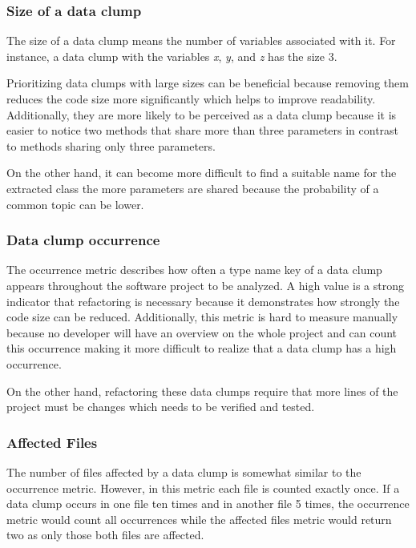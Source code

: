\subsubsection{Size of a data clump}

The size of a data clump means the number of variables associated with it. For instance, a data clump with the variables \textit{x}, \textit{y}, and \textit{z} has the size 3. 

Prioritizing data clumps with large sizes can be beneficial because removing them reduces the code size more significantly which helps to improve readability. Additionally, they are more likely to be perceived as a data clump because it is easier to notice two methods that share more than three parameters in contrast to methods sharing only three parameters. 

On the other hand,  it can become more difficult to find a suitable name for the extracted class the more parameters are shared because the probability of a common topic can be lower. 

\subsubsection{Data clump occurrence}

The occurrence metric describes how often a type name key of a data clump appears throughout the software project to be analyzed. A high value is a strong indicator that refactoring is necessary because it demonstrates how strongly the code size can be reduced. Additionally, this metric is hard to measure manually because no developer will have an overview on the whole project and can count this occurrence making it more difficult to realize that a data clump has a high occurrence.  

On the other hand, refactoring these data clumps require that more lines of the project must be changes which needs to be verified and tested. 

\subsubsection{Affected Files}

The number of files affected by a data clump is somewhat  similar to the occurrence metric. However, in this metric each file is counted exactly once. If a data clump occurs in one file ten times and in another file 5 times, the occurrence metric would count all occurrences while the affected files metric would return two as only those both files are affected. 

